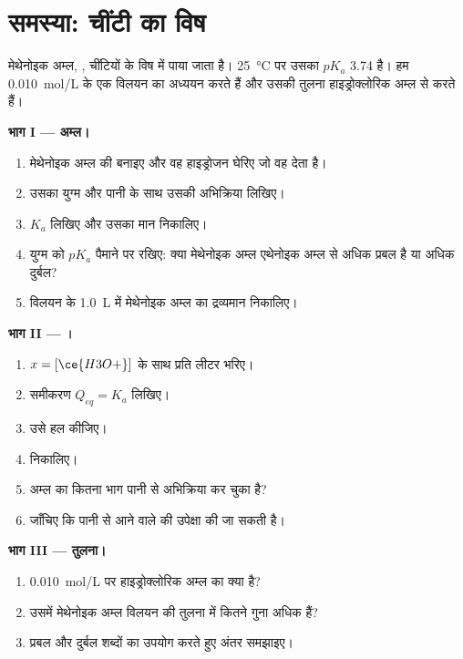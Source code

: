 \section{समस्या: चींटी का विष}


\begin{problem}
\label{pb:g12:ka-and-pka:1}
मेथेनोइक अम्ल, , चींटियों के विष में पाया जाता है।
\qty{25}{\celsius} पर उसका $pK_a$ 3.74 है। हम \qty{0.010}{mol/L} के एक विलयन का अध्ययन करते हैं और
उसकी तुलना हाइड्रोक्लोरिक अम्ल से करते हैं।

\medskip
\noindent\textbf{भाग I --- अम्ल।}
\begin{enumerate}
  \item मेथेनोइक अम्ल की  बनाइए और वह
        हाइड्रोजन घेरिए जो वह देता है।
  \item उसका युग्म और पानी के साथ उसकी अभिक्रिया लिखिए।
  \item $K_a$ लिखिए और उसका मान निकालिए।
  \item युग्म को $pK_a$ पैमाने पर रखिए: क्या मेथेनोइक अम्ल एथेनोइक अम्ल से
        अधिक प्रबल है या अधिक दुर्बल?
  \item विलयन के \qty{1.0}{L} में मेथेनोइक अम्ल का द्रव्यमान
        निकालिए।
\end{enumerate}

\medskip
\noindent\textbf{भाग II --- ।}
\begin{enumerate}[resume]
  \item $x = [\ce{H3O+}]$ के साथ प्रति लीटर  भरिए।
  \item समीकरण $Q_{eq} = K_a$ लिखिए।
  \item उसे हल कीजिए।
  \item {} निकालिए।
  \item अम्ल का कितना भाग पानी से अभिक्रिया कर चुका है?
  \item जाँचिए कि पानी से आने वाले  की उपेक्षा की जा सकती है।
\end{enumerate}

\medskip
\noindent\textbf{भाग III --- तुलना।}
\begin{enumerate}[resume]
  \item \qty{0.010}{mol/L} पर हाइड्रोक्लोरिक अम्ल का  क्या है?
  \item उसमें मेथेनोइक अम्ल विलयन की तुलना में कितने गुना अधिक
         हैं?
  \item प्रबल और दुर्बल शब्दों का उपयोग करते हुए अंतर समझाइए।
\end{enumerate}


\end{problem}
